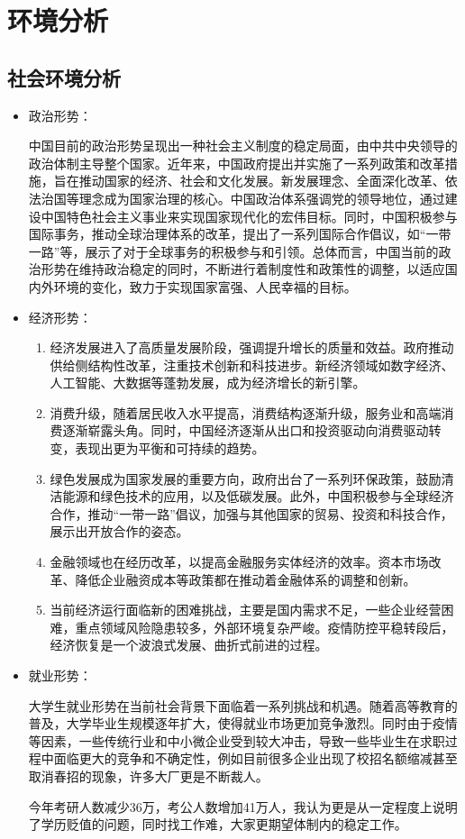 \documentclass{article}
\begin{document}
\section{环境分析}
\subsection{社会环境分析}
\begin{itemize}
	
\item 政治形势：\par
中国目前的政治形势呈现出一种社会主义制度的稳定局面，由中共中央领导的政治体制主导整个国家。近年来，中国政府提出并实施了一系列政策和改革措施，旨在推动国家的经济、社会和文化发展。新发展理念、全面深化改革、依法治国等理念成为国家治理的核心。中国政治体系强调党的领导地位，通过建设中国特色社会主义事业来实现国家现代化的宏伟目标。同时，中国积极参与国际事务，推动全球治理体系的改革，提出了一系列国际合作倡议，如“一带一路”等，展示了对于全球事务的积极参与和引领。总体而言，中国当前的政治形势在维持政治稳定的同时，不断进行着制度性和政策性的调整，以适应国内外环境的变化，致力于实现国家富强、人民幸福的目标。\par
\item 经济形势：
\begin{enumerate}
	\item 经济发展进入了高质量发展阶段，强调提升增长的质量和效益。政府推动供给侧结构性改革，注重技术创新和科技进步。新经济领域如数字经济、人工智能、大数据等蓬勃发展，成为经济增长的新引擎。
	\item 消费升级，随着居民收入水平提高，消费结构逐渐升级，服务业和高端消费逐渐崭露头角。同时，中国经济逐渐从出口和投资驱动向消费驱动转变，表现出更为平衡和可持续的趋势。
	\item 绿色发展成为国家发展的重要方向，政府出台了一系列环保政策，鼓励清洁能源和绿色技术的应用，以及低碳发展。此外，中国积极参与全球经济合作，推动“一带一路”倡议，加强与其他国家的贸易、投资和科技合作，展示出开放合作的姿态。
	\item 金融领域也在经历改革，以提高金融服务实体经济的效率。资本市场改革、降低企业融资成本等政策都在推动着金融体系的调整和创新。
	\item 当前经济运行面临新的困难挑战，主要是国内需求不足，一些企业经营困难，重点领域风险隐患较多，外部环境复杂严峻。疫情防控平稳转段后，经济恢复是一个波浪式发展、曲折式前进的过程。
\end{enumerate}
\item 就业形势：\par
\par 大学生就业形势在当前社会背景下面临着一系列挑战和机遇。随着高等教育的普及，大学毕业生规模逐年扩大，使得就业市场更加竞争激烈。同时由于疫情等因素，一些传统行业和中小微企业受到较大冲击，导致一些毕业生在求职过程中面临更大的竞争和不确定性，例如目前很多企业出现了校招名额缩减甚至取消春招的现象，许多大厂更是不断裁人。\par
\par 今年考研人数减少36万，考公人数增加41万人，我认为更是从一定程度上说明了学历贬值的问题，同时找工作难，大家更期望体制内的稳定工作。
\end{itemize}
\end{document}
